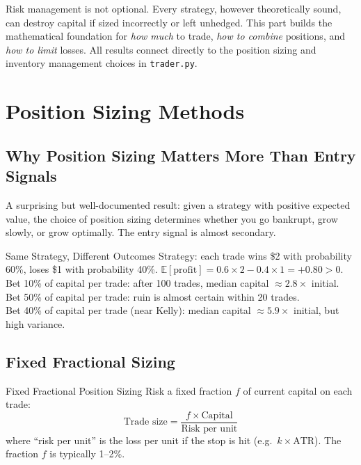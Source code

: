 \documentclass[12pt,a4paper,openany]{report}
\theoremstyle{definition}
\newcommand{\E}{\mathbb{E}}
\begin{document}
Risk management is not optional. Every strategy, however theoretically sound, can destroy capital if sized incorrectly or left unhedged. This part builds the mathematical foundation for \emph{how much} to trade, \emph{how to combine} positions, and \emph{how to limit} losses. All results connect directly to the position sizing and inventory management choices in \texttt{trader.py}.

\chapter{Position Sizing Methods}

\section{Why Position Sizing Matters More Than Entry Signals}

A surprising but well-documented result: given a strategy with positive expected value, the choice of position sizing determines whether you go bankrupt, grow slowly, or grow optimally. The entry signal is almost secondary.

\begin{examplebox}{Same Strategy, Different Outcomes}
Strategy: each trade wins \$2 with probability 60\%, loses \$1 with probability 40\%. $\E[\text{profit}] = 0.6\times2 - 0.4\times1 = +0.80 > 0$. \\
Bet 10\% of capital per trade: after 100 trades, median capital $\approx 2.8\times$ initial. \\
Bet 50\% of capital per trade: ruin is almost certain within 20 trades. \\
Bet 40\% of capital per trade (near Kelly): median capital $\approx 5.9\times$ initial, but high variance.
\end{examplebox}

\section{Fixed Fractional Sizing}

\begin{definitionbox}{Fixed Fractional Position Sizing}
Risk a fixed fraction $f$ of current capital on each trade:
\[
  \text{Trade size} = \frac{f \times \text{Capital}}{\text{Risk per unit}}
\]
where ``risk per unit'' is the loss per unit if the stop is hit (e.g.\ $k \times \text{ATR}$). The fraction $f$ is typically 1--2\%.
\end{definitionbox}
\end{document}
